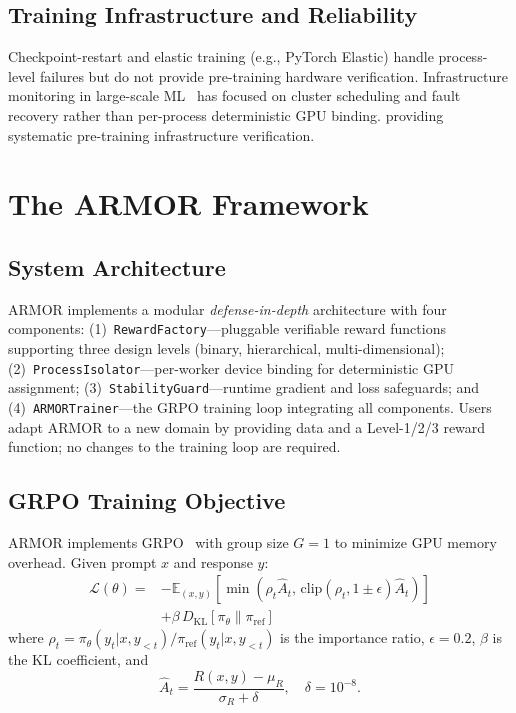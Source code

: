 \documentclass{ieeeaccess}
\begin{document}
\subsection{Training Infrastructure and Reliability}
Checkpoint-restart and elastic training (e.g., PyTorch Elastic) handle process-level failures
but do not provide pre-training hardware verification.
Infrastructure monitoring in large-scale ML~\cite{brown2020language} has focused on
cluster scheduling and fault recovery rather than per-process deterministic GPU binding.
providing systematic pre-training infrastructure verification.


\section{The ARMOR Framework}
\label{sec:methodology}

\subsection{System Architecture}
ARMOR implements a modular \textit{defense-in-depth} architecture with four components:
(1)~\texttt{RewardFactory}---pluggable verifiable reward functions supporting
three design levels (binary, hierarchical, multi-dimensional);
(2)~\texttt{ProcessIsolator}---per-worker device binding for deterministic GPU assignment;
(3)~\texttt{StabilityGuard}---runtime gradient and loss safeguards;
and (4)~\texttt{ARMORTrainer}---the GRPO training loop integrating all components.
Users adapt ARMOR to a new domain by providing data and a Level-1/2/3 reward function;
no changes to the training loop are required.

\subsection{GRPO Training Objective}
\label{sec:grpo_obj}
ARMOR implements GRPO~\cite{shao2024deepseekmath} with group size $G=1$
to minimize GPU memory overhead. Given prompt $x$ and response $y$:
\begin{align}
\mathcal{L}(\theta) = &-\mathbb{E}_{(x,y)}\!\left[\min\!\left(\rho_t\hat{A}_t,\,
\mathrm{clip}(\rho_t,1\pm\epsilon)\hat{A}_t\right)\right] \nonumber\\
&+ \beta\,D_{\mathrm{KL}}[\pi_\theta\|\pi_{\mathrm{ref}}]
\label{eq:grpo}
\end{align}
where $\rho_t = \pi_\theta(y_t|x,y_{<t}) / \pi_{\mathrm{ref}}(y_t|x,y_{<t})$
is the importance ratio, $\epsilon{=}0.2$, $\beta$ is the KL coefficient, and
\begin{equation}
\hat{A}_t = \frac{R(x,y) - \mu_R}{\sigma_R + \delta}, \quad \delta=10^{-8}.
\label{eq:adv}
\end{equation}
\end{document}
